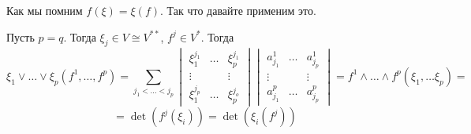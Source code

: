 Как мы помним $f(\xi) = \xi(f)$. Так что давайте применим это.

Пусть $p= q$. Тогда $\xi_j \in V  \cong V^{**}$, $f^j \in V^*$. Тогда
$$\xi_1 \vee \ldots \vee \xi_p(f^1,\ldots, f^p) = \sum\limits_{j_1<\ldots<j_p} \begin{vmatrix}
    \xi_1^{j_1} & \ldots & \xi_p^{j_1}\\
    \vdots & & \vdots \\
    \xi_1^{j_p} & \ldots &\xi_p^{j_o}
\end{vmatrix} \begin{vmatrix}
    a^1_{j_1} & \ldots & a^1_{j_p}\\
    \vdots & & \vdots \\
    a_{j_1}^p & \ldots & a^p_{j_p}
\end{vmatrix} = f^1 \wedge \ldots \wedge f^p(\xi_1,\ldots \xi_p) =$$
$$= \det (f^j(\xi_i))=\det (\xi_i(f^j))$$ 